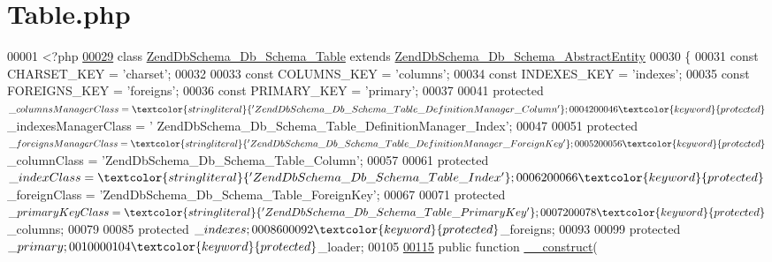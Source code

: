 \hypertarget{Table_8php}{\section{Table.\-php}
\label{Table_8php}
}

\begin{DoxyCode}
00001 <?php
\hypertarget{Table_8php_source_l00029}{}\hyperlink{classZendDbSchema__Db__Schema__Table}{00029} \textcolor{keyword}{class }\hyperlink{classZendDbSchema__Db__Schema__Table}{ZendDbSchema\_Db\_Schema\_Table} \textcolor{keyword}{extends} 
      \hyperlink{classZendDbSchema__Db__Schema__AbstractEntity}{ZendDbSchema\_Db\_Schema\_AbstractEntity} 
00030 \{
00031     \textcolor{keyword}{const} CHARSET\_KEY  = \textcolor{stringliteral}{'charset'};
00032 
00033     \textcolor{keyword}{const} COLUMNS\_KEY  = \textcolor{stringliteral}{'columns'};
00034     \textcolor{keyword}{const} INDEXES\_KEY  = \textcolor{stringliteral}{'indexes'};
00035     \textcolor{keyword}{const} FOREIGNS\_KEY = \textcolor{stringliteral}{'foreigns'};
00036     \textcolor{keyword}{const} PRIMARY\_KEY  = \textcolor{stringliteral}{'primary'};
00037 
00041     \textcolor{keyword}{protected} $\_columnsManagerClass = \textcolor{stringliteral}{'
      ZendDbSchema\_Db\_Schema\_Table\_DefinitionManager\_Column'};
00042 
00046     \textcolor{keyword}{protected} $\_indexesManagerClass = \textcolor{stringliteral}{'
      ZendDbSchema\_Db\_Schema\_Table\_DefinitionManager\_Index'};
00047 
00051     \textcolor{keyword}{protected} $\_foreignsManagerClass = \textcolor{stringliteral}{'
      ZendDbSchema\_Db\_Schema\_Table\_DefinitionManager\_ForeignKey'};
00052 
00056     \textcolor{keyword}{protected} $\_columnClass = \textcolor{stringliteral}{'ZendDbSchema\_Db\_Schema\_Table\_Column'};
00057 
00061     \textcolor{keyword}{protected} $\_indexClass = \textcolor{stringliteral}{'ZendDbSchema\_Db\_Schema\_Table\_Index'};
00062 
00066     \textcolor{keyword}{protected} $\_foreignClass = \textcolor{stringliteral}{'ZendDbSchema\_Db\_Schema\_Table\_ForeignKey'};
00067 
00071     \textcolor{keyword}{protected} $\_primaryKeyClass = \textcolor{stringliteral}{'ZendDbSchema\_Db\_Schema\_Table\_PrimaryKey'};
00072 
00078     \textcolor{keyword}{protected} $\_columns;
00079 
00085     \textcolor{keyword}{protected} $\_indexes;
00086 
00092     \textcolor{keyword}{protected} $\_foreigns;
00093 
00099     \textcolor{keyword}{protected} $\_primary;
00100 
00104     \textcolor{keyword}{protected} $\_loader;
00105 
\hypertarget{Table_8php_source_l00115}{}\hyperlink{classZendDbSchema__Db__Schema__Table_a6cd2e671ba94a27051600589dceca7b9}{00115}     \textcolor{keyword}{public} \textcolor{keyword}{function} \hyperlink{classZendDbSchema__Db__Schema__Table_a6cd2e671ba94a27051600589dceca7b9}{\_\_construct}(

\end{DoxyCode}
